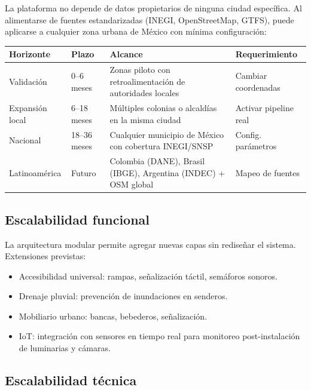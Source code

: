 \documentclass[12pt,a4paper]{article}
\begin{document}
La plataforma no depende de datos propietarios de ninguna ciudad específica. Al alimentarse de fuentes estandarizadas (INEGI, OpenStreetMap, GTFS), puede aplicarse a cualquier zona urbana de México con mínima configuración:

\begin{table}[H]
\centering
\small
\renewcommand{\arraystretch}{1.3}
\begin{tabularx}{\textwidth}{l l X l}
\toprule
\rowcolor{azuloscuro}
\color{white}\textbf{Horizonte} & \color{white}\textbf{Plazo} & \color{white}\textbf{Alcance} & \color{white}\textbf{Requerimiento} \\
\midrule
Validación & 0–6 meses & Zonas piloto con retroalimentación de autoridades locales & Cambiar coordenadas \\
\rowcolor{fondoazul}
Expansión local & 6–18 meses & Múltiples colonias o alcaldías en la misma ciudad & Activar pipeline real \\
Nacional & 18–36 meses & Cualquier municipio de México con cobertura INEGI/SNSP & Config. parámetros \\
\rowcolor{fondoazul}
Latinoamérica & Futuro & Colombia (DANE), Brasil (IBGE), Argentina (INDEC) + OSM global & Mapeo de fuentes \\
\bottomrule
\end{tabularx}
\end{table}

\subsection{Escalabilidad funcional}

La arquitectura modular permite agregar nuevas capas sin rediseñar el sistema. Extensiones previstas:

\begin{itemize}[leftmargin=1.5cm, itemsep=3pt]
  \item Accesibilidad universal: rampas, señalización táctil, semáforos sonoros.
  \item Drenaje pluvial: prevención de inundaciones en senderos.
  \item Mobiliario urbano: bancas, bebederos, señalización.
  \item IoT: integración con sensores en tiempo real para monitoreo post-instalación de luminarias y cámaras.
\end{itemize}

\subsection{Escalabilidad técnica}
\end{document}
